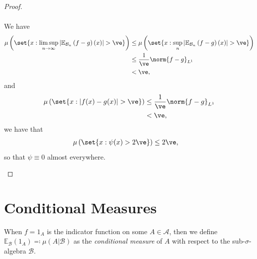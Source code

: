 \documentclass[10pt]{mypackage}
\renewcommand{\eqcolon}{\eqqcolon}
\begin{document}
\begin{proof}
\begin{enumerate}[(i)]
\begin{align*}
      \end{align*}
      We have
      \begin{align*}
        \mu\left( \set{x : \limsup_{n\to\infty} \left\vert \mathbb{E}_{\mathcal{B}_n}\left( f-g \right)(x) \right\vert > \ve} \right) &\leq \mu\left( \set{x: \sup_{n} \left\vert \mathbb{E}_{\mathcal{B}_n}\left( f-g \right)(x) \right\vert > \ve} \right)\\
                                                &\leq \frac{1}{\ve}\norm{f-g}_{L^1}\\
                                                &< \ve,
      \end{align*}
      and
      \begin{align*}
        \mu\left( \set{x : \left\vert f(x)-g(x) \right\vert > \ve} \right) &\leq \frac{1}{\ve}\norm{f-g}_{L^1}\\
                                                                           &< \ve,
      \end{align*}
      we have that
      \begin{align*}
        \mu\left( \set{x : \psi(x) > 2\ve} \right) &\leq 2\ve,
      \end{align*}
      so that $\psi \equiv 0$ almost everywhere.
  \end{enumerate}
\end{proof}
\section{Conditional Measures}%
When $f = 1_A$ is the indicator function on some $A\in \mathcal{A}$, then we define $ \mathbb{E}_{\mathcal{B}} \left( 1_A \right) \eqcolon \mu\left( A|\mathcal{B} \right)$ as the \textit{conditional measure} of $A$ with respect to the sub-$\sigma$-algebra $\mathcal{B}$.
\end{document}
